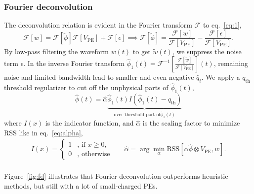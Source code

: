 \subsubsection{Fourier deconvolution}
\label{sec:fourier}
The deconvolution relation is evident in the Fourier transform $\mathcal{F}$ to eq.~\eqref{eq:1},
\begin{equation}
  \label{eq:fourier}
  \mathcal{F}[w]  = \mathcal{F}[\tilde{\phi}]\mathcal{F}[V_\mathrm{PE}] + \mathcal{F}[\epsilon]
  \implies \mathcal{F}[\tilde{\phi}]  = \frac{\mathcal{F}[w]}{\mathcal{F}[V_\mathrm{PE}]} - \frac{\mathcal{F}[\epsilon]}{\mathcal{F}[V_\mathrm{PE}]}.
\end{equation}
By low-pass filtering the waveform $w(t)$ to get $\tilde{w}(t)$, we suppress the noise term $\epsilon$.  In the inverse Fourier transform $\hat{\phi}_1(t) = \mathcal{F}^{-1}\left[\frac{\mathcal{F}[\tilde{w}]}{\mathcal{F}[V_\mathrm{PE}]}\right](t)$, remaining noise and limited bandwidth lead to smaller and even negative $\hat{q}_i$.  We apply a $q_\mathrm{th}$ threshold regularizer to cut off the unphysical parts of $\hat{\phi}_1(t)$,
\begin{equation}
  \label{eq:fdconv2}
    \hat{\phi}(t) = \hat{\alpha}\underbrace{\hat{\phi}_1(t) I\left(\hat{\phi}_1(t) - q_\mathrm{th}\right)}_{\text{over-threshold part of} \hat{\phi}_1(t)}  
\end{equation}
where $I(x)$ is the indicator function, and $\hat{\alpha}$ is the scaling factor to minimize $\mathrm{RSS}$ like in eq.~\eqref{eq:alpha},
\begin{equation*}
  \begin{aligned}
  \label{eq:id}
  I(x) = \left\{
    \begin{array}{ll}
      1 & \mbox{, if $x\ge0$}, \\
      0 & \mbox{, otherwise}
    \end{array}
    \right.
    \quad~~~
    \hat{\alpha} = \arg \underset{\alpha}{\min}\mathrm{RSS}\left[\alpha \hat{\phi} \otimes V_\mathrm{PE}, w\right]. \\
  \end{aligned}
\end{equation*}

Figure~\ref{fig:fd} illustrates that Fourier deconvolution outperforms heuristic methods, but still with a lot of small-charged PEs.

